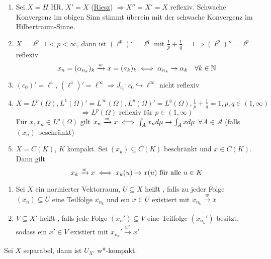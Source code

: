 \begin{beispiel}
	\begin{enumerate}[label=\alph*\upshape)]
		\item Sei $X = H$ HR, $X' = X$ (\hyperref[lemma:6.3]{Riesz}) $\Rightarrow X'' = X' = X$ reflexiv. Schwache Konvergenz im obigen Sinn stimmt überein mit der schwache Konvergenz im Hilbertraum-Sinne.
		\item $X = \ell^{p}, 1 < p < \infty$, dann ist $\left( \ell^{p} \right)' = \ell^{q}$ mit $\frac{1}{p} + \frac{1}{q} = 1 \Rightarrow \left(\ell^{p}\right)'' = \ell^{p}$ reflexiv
			\[ x_{n} = (\alpha_{n_{k}})_{k} \xrightarrow[]{w} x = (a_{k})_{k} \iff \alpha_{n_{k}} \rightarrow \alpha_{k} \quad \forall k \in \mathbb{N} \]
		\item $(c_{0})' = \ell^{1}$, $(\ell^{1})' = \ell^{\infty} \Rightarrow J_{c_{0}} \colon c_{0} \hookrightarrow \ell^{\infty}$ nicht reflexiv
		\item $X = L^{p}(\Omega), L^{1}(\Omega)' = L^{\infty}(\Omega), L^{p}(\Omega)' = L^{q}(\Omega), \frac{1}{p} + \frac{1}{q} = 1,  p, q \in (1, \infty)$
			\[ \Rightarrow L^{p}(\Omega) \text{ reflexiv für } p \in (1, \infty) \]
			Für $x, x_{n} \in L^{p}(\Omega)$ gilt $x_{n} \xrightarrow[]{w} x \iff \int_{A} x_{n} d\mu \rightarrow \int_{A} x d\mu$ $\forall A \in \mathcal{A}$ (falls $(x_{n})$ beschränkt)
		\item $X = C(K)$, $K$ kompakt. Sei $(x_{k}) \subseteq C(K)$ beschränkt und $x \in C(K)$. Dann gilt
			\[ x_{k} \xrightarrow[]{w} x \iff x_{k}(u) \rightarrow x(u) \text{ für alle } u \in K \]
	\end{enumerate}
\end{beispiel}


\begin{definition}
	\begin{enumerate}[label=\alph*\upshape)]
		\item Sei $X$ ein normierter Vektorraum, $U \subseteq X$ hei{\ss}t , falls zu jeder Folge $(x_{n}) \subseteq U$ eine Teilfolge $x_{n_{k}}$ und ein $x \in U$ existiert mit $x_{n_{k}} \xrightarrow[]{w} x$
		\item $V \subseteq X'$ hei{\ss}t , falls jede Folge $(x_{n}') \subseteq V$ eine Teilfolge $(x_{n_{k}}')$ besitzt, sodass ein $x' \in V$ existiert mit $x_{n_{k}}' \xrightarrow[]{w^{*}} x'$
	\end{enumerate}
\end{definition}


\begin{satz} 
	Sei $X$ separabel, dann ist $U_{X'}$ w*-kompakt.	
\end{satz}

